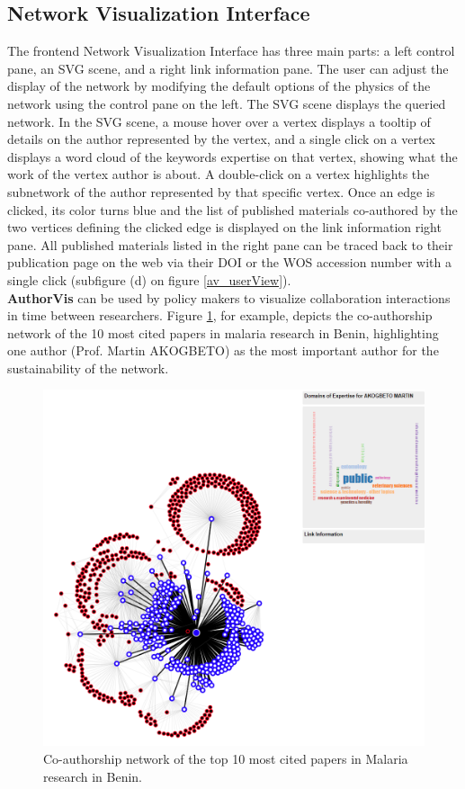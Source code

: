 \subsection{Network Visualization Interface}
The frontend Network Visualization Interface has three main parts: a left control pane, an SVG scene, and a right link information pane. The user can adjust the display of the network by modifying the default options of the physics of the network \cite{newman_physics_2008} using the control pane on the left. The SVG scene displays the queried network. In the SVG scene, a mouse hover over a vertex displays a tooltip of details on the author represented by the vertex, and a single click on a vertex displays a word cloud of the keywords expertise on that vertex, showing what the work of the vertex author is about. A double-click on a vertex highlights the subnetwork of the author represented by that specific vertex. Once an edge is clicked, its color turns blue and the list of published materials co-authored by the two vertices defining the clicked edge is displayed on the link information right pane. All published materials listed in the right pane can be traced back to their publication page on the web via their DOI or the WOS accession number with a single click (subfigure (d) on figure \ref{av_userView}).\\
\textbf{AuthorVis} can be used by policy makers to visualize collaboration interactions in time between researchers. Figure \ref{mostCited}, for example, depicts the co-authorship network of the 10 most cited papers in malaria research in Benin, highlighting one author (Prof. Martin AKOGBETO) as the most important author for the sustainability of the network.

\begin{figure}[!ht]
\centering
\hspace{-1.5cm}\includegraphics[scale=0.5]{Chapters/authorvis/mostCited}
\caption{Co-authorship network of the top 10 most cited papers in Malaria research in Benin.}
\label{mostCited}
\end{figure}

